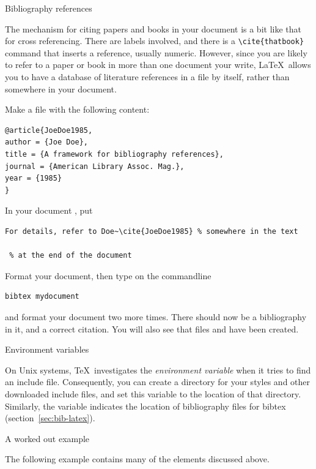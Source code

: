  {Bibliography references}
\label{sec:bib-latex}

The mechanism for citing papers and books in your document is a bit
like that for cross referencing. There are labels involved, and there
is a \verb+\cite{thatbook}+ command that inserts a reference, usually
numeric. However, since you are likely to refer to a paper or book in
more than one document your write, \LaTeX\ allows you to have a
database of literature references in a file by itself,
rather than somewhere in your document.

Make a file  with the following content:
\begin{verbatim}
@article{JoeDoe1985,
author = {Joe Doe},
title = {A framework for bibliography references},
journal = {American Library Assoc. Mag.},
year = {1985}
}
\end{verbatim}
In your document , put
\begin{verbatim}
For details, refer to Doe~\cite{JoeDoe1985} % somewhere in the text

 % at the end of the document

\end{verbatim}
Format your document, then type on the commandline
\begin{verbatim}
bibtex mydocument
\end{verbatim}
and format your document two more times. There should now be a
bibliography in it, and a correct citation. You will also see that
files  and  have been created.

 {Environment variables}
\label{sec:texinputs}

On Unix systems, \TeX\ investigates the  \emph{environment
variable} when it tries to find an include file. Consequently, you can
create a directory for your styles and other downloaded include files,
and set this variable to the location of that directory.
Similarly, the  variable indicates the location of
bibliography files for bibtex (section~\ref{sec:bib-latex}).


 {A worked out example}

The following example  contains many of the elements discussed above.

\begingroup\small

\endgroup

